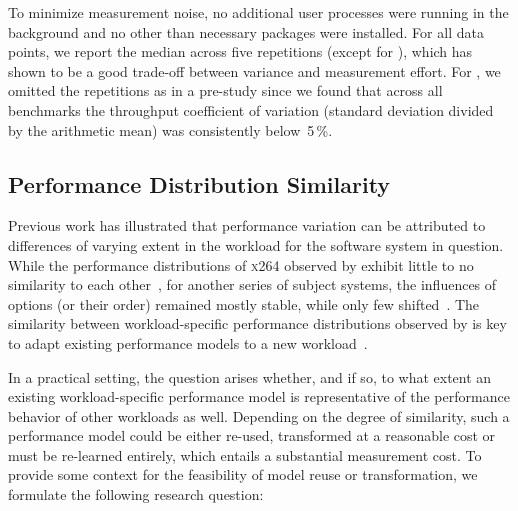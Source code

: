 {	To minimize measurement noise, no additional user processes were running in the background and no other than necessary packages were installed.
	For all data points, we report the median across five repetitions (except for \htwo), which has shown to be a good trade-off between variance and measurement effort. For \htwo, we omitted the repetitions as in a pre-study since we found that across all benchmarks the throughput coefficient of variation (standard deviation divided by the arithmetic mean) was consistently below~5\,\%. 
}

\subsection{Performance Distribution Similarity}\label{sec:rq1}
Previous work has illustrated that performance variation can be attributed to differences of varying extent in the workload for the software system in question. While the performance distributions of \textsc{x264} observed by \citeauthor{alves_sampling_2020} exhibit little to no similarity to each other~\cite{alves_sampling_2020}, for another series of subject systems, the influences of options (or their order) remained mostly stable, while only few shifted~\cite{jamshidi_transfer_gp_2017,jamishidi_transfer_2017}.  The similarity between workload-specific performance distributions observed by \citeauthor{jamshidi_learning_2018} is key to adapt existing performance models to a new workload~\cite{jamshidi_learning_2018}. 

In a practical setting, the question arises whether, and if so, to what extent an existing workload-specific performance model is representative of the performance behavior of other workloads as well. Depending on the degree of similarity, such a performance model could be either re-used, transformed at a reasonable cost or must be re-learned entirely, which entails a substantial measurement cost. To provide some context for the feasibility of model reuse or transformation, we formulate the following research question: 


